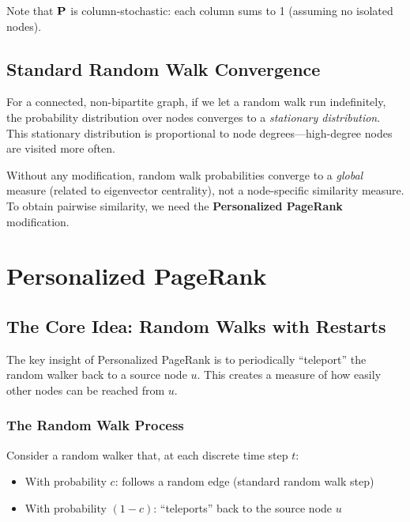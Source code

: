\begin{notechapter}
\begin{intuition}
Note that $\mathbf{P}$ is column-stochastic: each column sums to 1 (assuming no isolated nodes).
\end{intuition}

\subsection{Standard Random Walk Convergence}

For a connected, non-bipartite graph, if we let a random walk run indefinitely, the probability distribution over nodes converges to a \emph{stationary distribution}. This stationary distribution is proportional to node degrees---high-degree nodes are visited more often.

\begin{keyidea}
Without any modification, random walk probabilities converge to a \emph{global} measure (related to eigenvector centrality), not a node-specific similarity measure. To obtain pairwise similarity, we need the \textbf{Personalized PageRank} modification.
\end{keyidea}

\section{Personalized PageRank}

\subsection{The Core Idea: Random Walks with Restarts}

The key insight of Personalized PageRank is to periodically ``teleport'' the random walker back to a source node $u$. This creates a measure of how easily other nodes can be reached from $u$.

\subsubsection*{The Random Walk Process}

Consider a random walker that, at each discrete time step $t$:
\begin{itemize}
    \item With probability $c$: follows a random edge (standard random walk step)
    \item With probability $(1-c)$: ``teleports'' back to the source node $u$
\end{itemize}


\end{notechapter}
